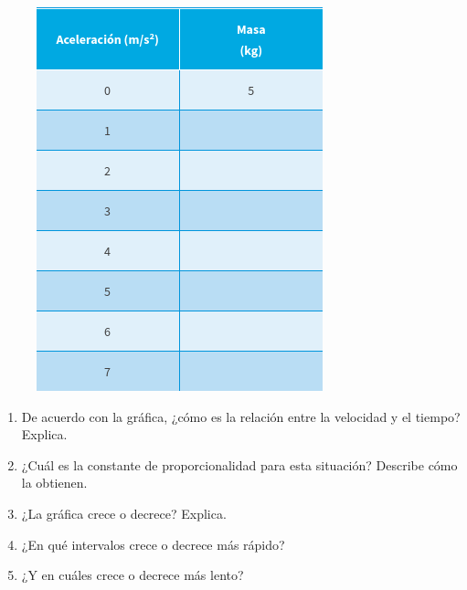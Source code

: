 \documentclass[11pt]{book}
\begin{document}
\begin{enumerate}
\begin{minipage}[t]{0.45\linewidth}
\begin{figure}[H]
            \includegraphics[width=\linewidth]{carro_control_tabla.jpg}
            \label{tab:carro_control_tabla}
          \end{figure}%
        \end{minipage}%
        \begin{minipage}[t]{0.5\linewidth}
          \begin{enumerate}
            \item De acuerdo con la gráfica, ¿cómo es la relación entre la velocidad y el tiempo? Explica.
            \item ¿Cuál es la constante de proporcionalidad para esta situación? Describe cómo la obtienen.
            \item ¿La gráfica crece o decrece? Explica.
            \item ¿En qué intervalos crece o decrece más rápido?
            \item ¿Y en cuáles crece o decrece más lento?

\end{enumerate}
\end{minipage}
\end{enumerate}
\end{document}
